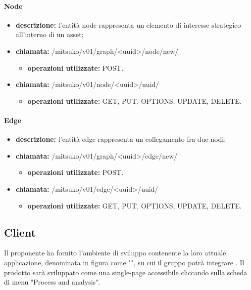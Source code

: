 	\paragraph{Node}
	\begin{itemize}
		\item \textbf{descrizione:} l'entità node rappresenta un elemento di interesse strategico all'interno di un asset;
		\item \textbf{chiamata:} /mitsuko/v01/graph/<uuid>/node/new/
		\begin{itemize}\item \textbf{operazioni utilizzate:} POST.\end{itemize}
		\item \textbf{chiamata:} /mitsuko/v01/node/<uuid>/uuid/
		\begin{itemize}\item \textbf{operazioni utilizzate:} GET, PUT, OPTIONS, UPDATE, DELETE.\end{itemize}
	\end{itemize}
	
	\paragraph{Edge}
	\begin{itemize}
		\item \textbf{descrizione:} l'entità edge rappresenta un collegamento fra due nodi;
		\item \textbf{chiamata:} /mitsuko/v01/graph/<uuid>/edge/new/
		\begin{itemize}\item \textbf{operazioni utilizzate:} POST.\end{itemize}
		\item \textbf{chiamata:} /mitsuko/v01/edge/<uuid>/uuid/
		\begin{itemize}\item \textbf{operazioni utilizzate:} GET, PUT, OPTIONS, UPDATE, DELETE.\end{itemize}
	\end{itemize}
	
	\newpage
	\subsection{Client}
	Il proponente ha fornito l'ambiente di sviluppo contenente la loro attuale applicazione, denominata in figura come "\riskapp", su cui il gruppo potrà integrare \progetto. Il prodotto sarà sviluppato come una single-page accessibile cliccando sulla scheda di menu "Process and analysis".
	
